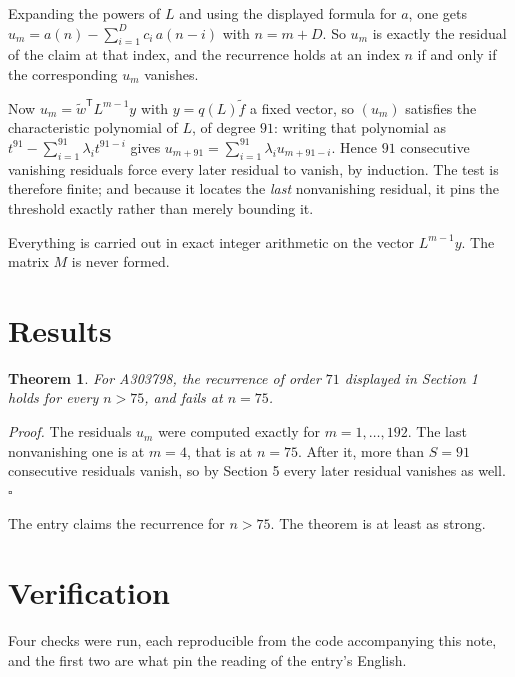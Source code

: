 \documentclass[11pt]{article}
\newtheorem{theorem}{Theorem}
\theoremstyle{definition}
\begin{document}
Expanding the powers of $L$ and using the displayed formula for $a$, one gets $u_m = a(n) - \sum_{i=1}^{D} c_i\,a(n-i)$ with $n = m + D$. So $u_m$ is exactly the residual of the claim at that index, and the recurrence holds at an index $n$ if and only if the corresponding $u_m$ vanishes.

Now $u_m = \tilde w^{\mathsf T} L^{m-1} y$ with $y = q(L)\tilde f$ a fixed vector, so $(u_m)$ satisfies the characteristic polynomial of $L$, of degree $91$: writing that polynomial as $t^{91} - \sum_{i=1}^{91} \lambda_i t^{91-i}$ gives $u_{m+91} = \sum_{i=1}^{91} \lambda_i u_{m+91-i}$. Hence $91$ consecutive vanishing residuals force every later residual to vanish, by induction. The test is therefore finite; and because it locates the {\itshape last} nonvanishing residual, it pins the threshold exactly rather than merely bounding it.

Everything is carried out in exact integer arithmetic on the vector $L^{m-1}y$. The matrix $M$ is never formed.

\section{Results}

\begin{theorem} For A303798, the recurrence of order $71$ displayed in Section 1 holds for every $n > 75$, and fails at $n = 75$.\end{theorem}

{\itshape Proof.} The residuals $u_m$ were computed exactly for $m = 1,\dots,192$. The last nonvanishing one is at $m = 4$, that is at $n = 75$. After it, more than $S = 91$ consecutive residuals vanish, so by Section 5 every later residual vanishes as well. $\square$

The entry claims the recurrence for $n > 75$. The theorem is at least as strong.

\section{Verification}

Four checks were run, each reproducible from the code accompanying this note, and the first two are what pin the reading of the entry's English.
\end{document}
